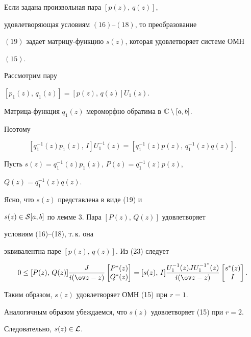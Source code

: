 \begin{lem}


Если задана произвольная пара $[p(z),\, q(z)]$,


удовлетворяющая условиям $(16)$--$(18)$, то преобразование


$(19)$ задает матрицу-функцию $s(z)$, которая удовлетворяет системе ОМН


$(15)$.


\end{lem}





\begin{pf}


Рассмотрим пару


$[ p_1(z),\,q_1(z)]=[ p(z),\, q(z)] U_1(z)$.


Матрица-функция $q_1(z)$ мероморфно обратима в ${\Bbb C}\setminus [a,b]$.


Поэтому


\begin{equation}


[q_1^{-1}(z)p_1(z),\, I]U_1^{-1}(z)=


[q_1^{-1}(z) p(z),\, q_1^{-1}(z)q(z)].


\end{equation}


Пусть $s(z)=q_1^{-1}(z)p_1(z)$, $P(z)=q_1^{-1}(z)p(z)$,


$Q(z)=q_1^{-1}(z)q(z)$.


Ясно, что $s(z)$ представлена в виде (19) и


$s(z)\in {\cal S}[a,b]$ по лемме 3. Пара $[P(z),\, Q(z)]$ удовлетворяет


условиям (16)--(18), т.\,к. она


эквивалентна паре $[p(z),\, q(z)]$. Из (23) следует


$$


0 \leq [P(z),\, Q(z)]\frac{J}{i(\ov z-z)}


\begin{bmatrix} P^*(z) \\


Q^*(z) \end{bmatrix}=


[s(z),\, I]\frac{U_1^{-1}(z)JU_1^{-1^*}(z)}{i(\ov z-z)}


\begin{bmatrix} s^*(z) \\ I \end{bmatrix}.


$$


Таким образом, $s(z)$ удовлетворяет ОМН (15) при $r=1$.


Аналогичным образом убеждаемся, что $s(z)$ удовлетворяет (15) при $r=2$.


Следовательно, $s(z) \in {\cal L}$.


\end{pf}





